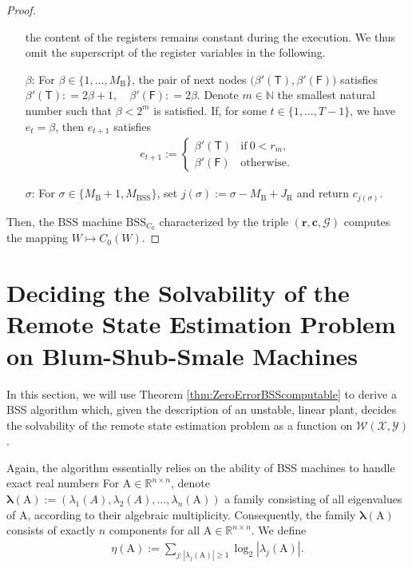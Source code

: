 \documentclass[conference]{IEEEtran}
\def\X{{\mathcal X}}
\def\Y{{\mathcal Y}}
\def\G{{\mathcal G}}
\def\W{{\mathcal W}}
\def\NN{{\mathbb N}}
\def\RR{{\mathbb R}}
\def\mA{\bm{\mathrm{A}}}
\newcommand{\BSS}{\mathrm{BSS}}
\begin{document}
\begin{proof}
\begin{enumerate}
											the content of the registers remains constant during the execution. We thus omit the superscript of the
											register variables in the following.
										\item[\(\beta\)\hspace{1pt}:] 
											For \(\beta \in \{1,\ldots, M_\mathrm{B}\}\), the pair of next nodes \(\big(\beta'(\mathsf{T}),\beta'(\mathsf{F})\big)\) satisfies
											\(	\beta'(\mathsf{T}) :    =  2\beta + 1, \quad
												\beta'(\mathsf{F}) :    =  2\beta.
											\)
											Denote \(m\in\NN\) the smallest natural number such that \(\beta < 2^m\) is satisfied. If, for some \(t\in\{1,\ldots, T-1\}\), we have
											\(e_t = \beta\), then \(e_{t+1}\) satisfies
											\begin{align*}   e_{t+1} := \begin{cases}	\beta'(\mathsf{T}) &\text{if}~ 0 < r_m,\\
																						\beta'(\mathsf{F}) &\text{otherwise}.
																		\end{cases}
											\end{align*}
										\item[\(\sigma\)\hspace{1pt}:] For \(\sigma \in \{M_\mathrm{B} +1, M_\BSS\}\), set \(j(\sigma) := \sigma - M_\mathrm{B} + J_\mathrm{R}\) 
											and return \(c_{j(\sigma)}\).
					\end{enumerate}
					Then, the BSS machine \(\BSS_{C_0}\) characterized by the triple \((\bm{r}, \bm{c}, \G)\) computes the mapping \(W\mapsto C_0(W)\).
	\end{proof}

\section{Deciding the Solvability of the Remote State Estimation Problem on Blum-Shub-Smale Machines}	\label{sec:DecidingRemoteStateEstimationOnBSS}
	In this section, we will use Theorem \ref{thm:ZeroErrorBSScomputable} to derive a BSS algorithm which, given the description of an unstable, linear plant,
	decides the solvability of the remote state estimation problem as a function on \(\W(\X,\Y)\).
	
	Again, the algorithm essentially relies on the ability of BSS machines to handle exact real numbers 
	For \(\mA \in \RR^{n\times n}\), denote \(\bm{\lambda}(\mA) := (\lambda_1(A),\lambda_2(A),\ldots,\lambda_n(\mA))\) a family 
	consisting of all eigenvalues of \(\mA\), according to their algebraic multiplicity. Consequently, the family \(\bm{\lambda}(\mA)\)
	consists of exactly \(n\) components for all \(\mA\in \RR^{n\times n}\). We define
	\begin{align}	\eta(\mA):={\sum}_{j:|\lambda_j(\mA)|\geq 1} \log_2|\lambda_j(\mA)|.
	\end{align}
	
\end{document}
